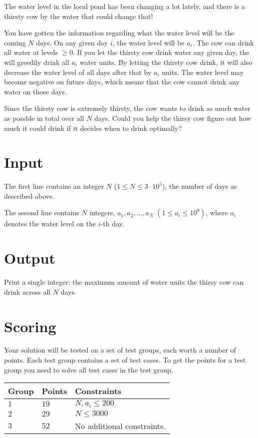 
The water level in the local pond has been changing a lot lately, and there is a thirsty cow by the water that could change that!

You have gotten the information regarding what the water level will be the coming $N$ days. 
On any given day $i$, the water level will be $a_i$. The cow can drink all water at levels $\geq 0$.
If you let the thirsty cow drink water any given day, the will greedily drink all $a_i$ water units. 
By letting the thirsty cow drink, it will also decrease the water level of all days after that by $a_i$ units. 
The water level may become negative on future days, which means that the cow cannot drink any water on those days.

Since the thirsty cow is extremely thirsty, the cow wants to drink as much water as possble in total over all $N$ days.
Could you help the thirsy cow figure out how much it could drink if it decides when to drink optimally?

\section*{Input}
The first line contains an integer $N$ ($1 \leq N \leq 3 \cdot 10^5$), the number of days as described above.

The second line contains $N$ integers, $a_1, a_2, \dots, a_N$ $(1 \leq a_i \leq 10^9)$, where $a_i$ denotes the water level on the $i$-th day.

\section*{Output}
Print a single integer: the maximum amount of water units the thirsy cow can drink across all $N$ days. 

\section*{Scoring}
Your solution will be tested on a set of test groups, each worth a number of points. Each test group contains
a set of test cases. To get the points for a test group you need to solve all test cases in the test group.

\noindent
\begin{tabular}{| l | l | p{12cm} |}
  \hline
  \textbf{Group} & \textbf{Points} & \textbf{Constraints} \\ \hline
  $1$    & $19$       & $N, a_i \leq 200$ \\ \hline
  $2$    & $29$       & $N \leq 3000$ \\ \hline
  $3$    & $52$       & No additional constraints. \\ \hline
\end{tabular}

